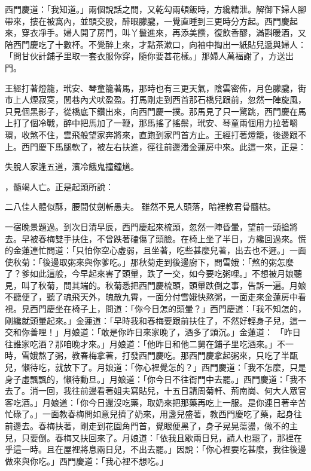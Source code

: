 西門慶道：「我知道。」兩個說話之間，又乾勾兩頓飯時，方纔精泄。解御下婦人腳帶來，摟在被窩內，並頭交股，醉眼朦朧，一覺直睡到三更時分方起。西門慶起來，穿衣凈手。婦人開了房門，叫丫鬟進來，再添美饌，復飲香醪，滿斟暖酒，又陪西門慶吃了十數杯。不覺醉上來，才點茶漱口，向袖中掏出一紙貼兒遞與婦人：「問甘伙計鋪子里取一套衣服你穿，隨你要甚花樣。」那婦人萬福謝了，方送出門。

王經打著燈籠，玳安、琴童籠著馬，那時也有三更天氣，陰雲密佈，月色朦朧，街市上人煙寂寞，閭巷內犬吠盈盈。打馬剛走到西首那石橋兒跟前，忽然一陣旋風，只見個黑影子，從橋底下鑽出來，向西門慶一撲。那馬見了只一驚跳，西門慶在馬上打了個冷戰，醉中把馬加了一鞭，那馬搖了搖鬃，玳安、琴童兩個用力拉著嚼環，收煞不住，雲飛般望家奔將來，直跑到家門首方止。王經打著燈籠，後邊跟不上。西門慶下馬腿軟了，被左右扶進，徑往前邊潘金蓮房中來。此這一來，正是：

失脫人家逢五道，濱冷餓鬼撞鐘馗。

，髓竭人亡。正是起頭所說：

二八佳人體似酥，腰間仗劍斬愚夫。
雖然不見人頭落，暗裡教君骨髓枯。

一宿晚景題過。到次日清早辰，西門慶起來梳頭，忽然一陣昏暈，望前一頭搶將去。早被春梅雙手扶住，不曾跌著磕傷了頭臉。在椅上坐了半日，方纔回過來。慌的金蓮連忙問道：「只怕你空心虛弱，且坐著，吃些甚麼兒著，出去也不遲。」一面使秋菊：「後邊取粥來與你爹吃。」那秋菊走到後邊廚下，問雪娥：「熬的粥怎麼了？爹如此這般，今早起來害了頭暈，跌了一交，如今要吃粥哩。」不想被月娘聽見，叫了秋菊，問其端的。秋菊悉把西門慶梳頭，頭暈跌倒之事，告訴一遍。月娘不聽便了，聽了魂飛天外，魄散九霄，一面分付雪娥快熬粥，一面走來金蓮房中看視。見西門慶坐在椅子上，問道：「你今日怎的頭暈？」西門慶道：「我不知怎的，剛纔就頭暈起來。」金蓮道：「早時我和春梅要跟前扶住了，不然好輕身子兒，這一交和你善哩！」月娘道：「敢是你昨日來家晚了，酒多了頭沉。」金蓮道： 「昨日往誰家吃酒？那咱晚才來。」月娘道：「他昨日和他二舅在鋪子里吃酒來。」不一時，雪娥熬了粥，教春梅拿著，打發西門慶吃。那西門慶拿起粥來，只吃了半甌兒，懶待吃，就放下了。月娘道：「你心裡覺怎的？」西門慶道：「我不怎麼，只是身子虛飄飄的，懶待動旦。」月娘道：「你今日不往衙門中去罷。」西門慶道：「我不去了。消一回，我往前邊看著姐夫寫貼兒，十五日請周菊軒、荊南崗、何大人眾官客吃酒。」月娘道：「你今日還沒吃藥，取奶來把那藥再吃上一服。是你連日著辛苦忙碌了。」一面教春梅問如意兒擠了奶來，用盞兒盛著，教西門慶吃了藥，起身往前邊去。春梅扶著，剛走到花園角門首，覺眼便黑了，身子晃晃蕩盪，做不的主兒，只要倒。春梅又扶回來了。月娘道：「依我且歇兩日兒，請人也罷了，那裡在乎這一時。且在屋裡將息兩日兒，不出去罷。」因說：「你心裡要吃甚麼，我往後邊做來與你吃。」西門慶道：「我心裡不想吃。」

